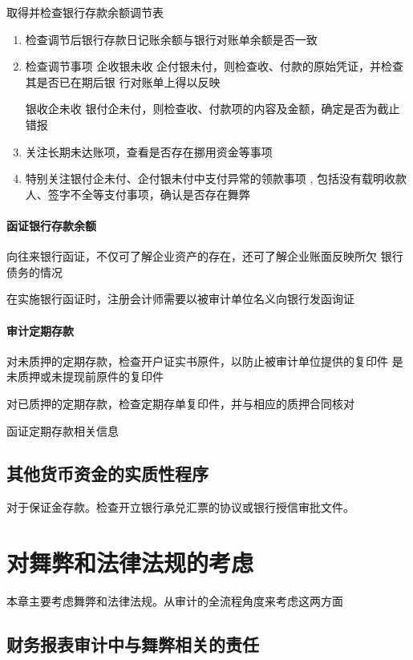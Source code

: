 \documentclass[UTF8,12pt]{ctexart}
\numberwithin{equation}{section} %
\numberwithin{figure}{section}
\numberwithin{table}{section}
\begin{document}
	取得并检查银行存款余额调节表
	\begin{enumerate}
		\item 检查调节后银行存款日记账余额与银行对账单余额是否一致
		
		\item 检查调节事项
		企收银未收 企付银未付，则检查收、付款的原始凭证，并检查其是否已在期后银 行对账单上得以反映
		
		银收企未收 银付企未付，则检查收、付款项的内容及金额，确定是否为截止错报
		
		\item 关注长期未达账项，查看是否存在挪用资金等事项 
		
		\item 特别关注银付企未付、企付银未付中支付异常的领款事项 , 包括没有载明收款 人、签字不全等支付事项，确认是否存在舞弊
	\end{enumerate}
	
	\paragraph{函证银行存款余额}
	向往来银行函证，不仅可了解企业资产的存在，还可了解企业账面反映所欠 银行债务的情况 
	
	在实施银行函证时，注册会计师需要以被审计单位名义向银行发函询证
	
	\paragraph{审计定期存款}
	对未质押的定期存款，检查开户证实书原件，以防止被审计单位提供的复印件 是未质押或未提现前原件的复印件 
	
	对已质押的定期存款，检查定期存单复印件，并与相应的质押合同核对 
	
	函证定期存款相关信息
	
	\subsection{其他货币资金的实质性程序}
	对于保证金存款。检查开立银行承兑汇票的协议或银行授信审批文件。
	
	\newpage
	\section{对舞弊和法律法规的考虑}
	本章主要考虑舞弊和法律法规。从审计的全流程角度来考虑这两方面
	
	\subsection{财务报表审计中与舞弊相关的责任}
	
\end{document}
